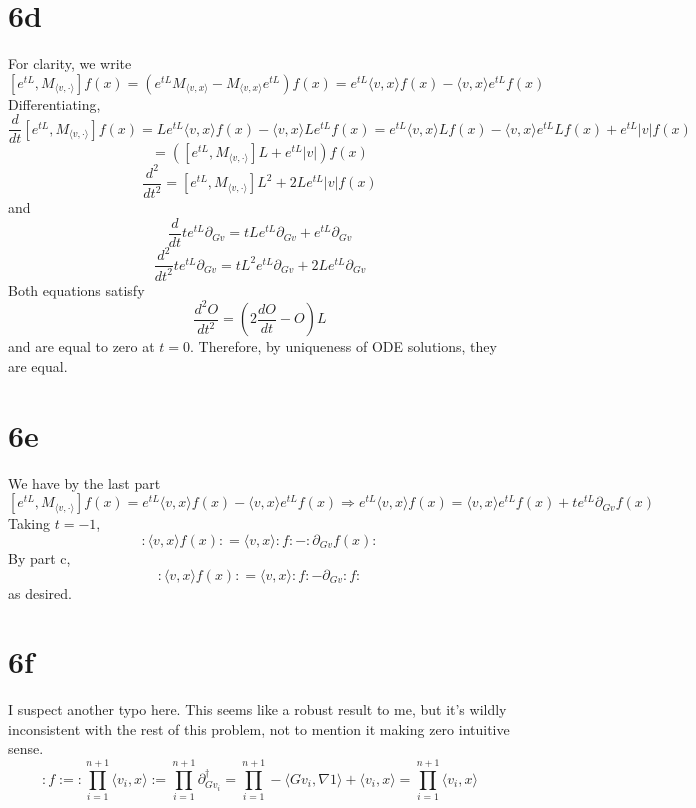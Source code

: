 \documentclass{article}
\begin{document}
\section*{6d}
For clarity, we write
\[
  [e^{tL},M_{\langle v,\cdot \rangle}]f(x)=\left( e^{tL}M_{\langle v,x \rangle}-M_{\langle v,x \rangle}e^{tL}\right)f(x)
 =e^{tL}\langle v,x \rangle f(x)-\langle v,x \rangle e^{tL}f(x)
\]
Differentiating,
\[
  \frac{d}{dt}[e^{tL},M_{\langle v,\cdot \rangle}]f(x)=Le^{tL}\langle v,x \rangle f(x)-\langle v,x\rangle Le^{tL}f(x)
  =e^{tL}\langle v,x \rangle Lf(x)-\langle v,x \rangle e^{tL}Lf(x)+e^{tL}|v|f(x)
\]
\[
  =\left( [e^{tL},M_{\langle v,\cdot \rangle}]L+e^{tL}|v|\right)f(x)
\]
\[
  \frac{d^{2}}{dt^{2}}=\left[ e^{tL},M_{\langle v,\cdot \rangle}\right]L^{2}+2Le^{tL}|v|f(x)
\]
and
\[
  \frac{d}{dt} te^{tL}\partial_{Gv}=tLe^{tL}\partial_{Gv}+e^{tL}\partial_{Gv}
\]
\[
  \frac{d^{2}}{dt^{2}}te^{tL}\partial_{Gv}=tL^{2}e^{tL}\partial_{Gv}+2Le^{tL}\partial_{Gv}
\]
Both equations satisfy
\[
  \frac{d^{2}O}{dt^{2}}=\left(2\frac{dO}{dt}-O\right)L
\]
and are equal to zero at $t=0$.
Therefore, by uniqueness of ODE solutions, they are equal.

\section*{6e}
We have by the last part
\[
  [e^{tL},M_{\langle v,\cdot \rangle}]f(x)=e^{tL}\langle v,x \rangle f(x)-\langle v,x \rangle e^{tL}f(x)
  \Rightarrow e^{tL}\langle v,x \rangle f(x)=\langle v,x  \rangle e^{tL}f(x) +te^{tL}\partial_{Gv}f(x)
\]
Taking $t=-1$,
\[
  :\langle v,x \rangle f(x): = \langle v,x \rangle :f: -:\partial_{Gv}f(x):
\]
By part c,
\[
  :\langle v,x \rangle f(x): =  \langle v,x \rangle :f: -\partial_{Gv}:f:
\]
as desired.

\section*{6f}
I suspect another typo here. This seems like a robust result to me, but it's wildly inconsistent with the rest of this problem,
not to mention it making zero intuitive sense.
\[
  :f:=:\prod_{i=1}^{n+1}\langle v_{i},x \rangle:=\prod_{i=1}^{n+1}\partial_{Gv_{i}}^{\dagger}
  =\prod_{i=1}^{n+1}-\langle Gv_{i},\nabla 1 \rangle+\langle v_{i},x \rangle
  =\prod_{i=1}^{n+1}\langle v_{i},x \rangle
\]
\end{document}
